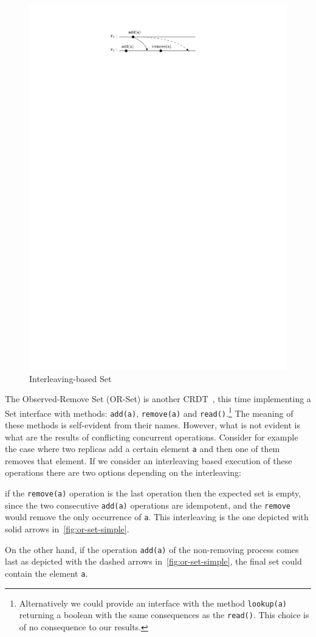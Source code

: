 \begin{figure}
  \centering
  \includegraphics[width=0.45 \textwidth]{./figures/OR-Set-simple}
  \caption{Interleaving-based Set}
  \label{fig:or-set-simple}
\end{figure}
The Observed-Remove Set (OR-Set) is another CRDT~\cite{ShapiroPBZ11},
this time implementing a Set interface with methods: \lstinline|add(a)|,
\lstinline|remove(a)| and \lstinline|read()|.\footnote{Alternatively
  we could provide an interface with the method \lstinline|lookup(a)|
  returning a boolean with the same consequences as the
  \lstinline|read()|. This choice is of no consequence to our results.}
%
The meaning of these methods is self-evident from their names.
%
However, what is not evident is what are the results of conflicting
concurrent operations.
%
Consider for example the case where two replicas add a certain element
\lstinline|a| and then one of them removes that element.
%
If we consider an interleaving based execution of these operations
there are two options depending on the interleaving:
\begin{inparaenum}[i)]
\item if the \lstinline|remove(a)| operation is the last operation
  then the expected set is empty, since the two consecutive
  \lstinline|add(a)| operations are idempotent, and the
  \lstinline|remove| would remove the only occurrence of
  \lstinline|a|. This interleaving is the one depicted with solid
  arrows in~\autoref{fig:or-set-simple}.
\item On the other hand, if the operation \lstinline|add(a)| of the
  non-removing process comes last as depicted with the dashed arrows
  in~\autoref{fig:or-set-simple}, the final set could contain the
  element \lstinline|a|.
\end{inparaenum}
